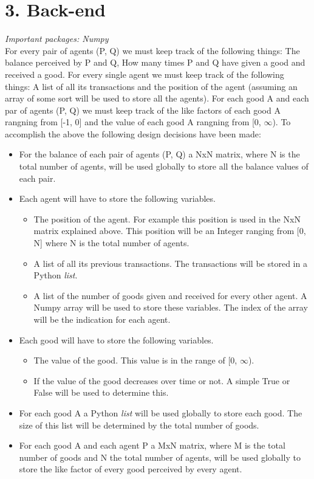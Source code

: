 \documentclass{article}
\begin{document}
\section{3. Back-end}
\textit{Important packages: Numpy}
\\
For every pair of agents (P, Q) we must keep track of the following things: The balance perceived by P and Q, How many times P and Q have given a good and received a good. For every single agent we must keep track of the following things: A list of all its transactions and the position of the agent (assuming an array of some sort will be used to store all the agents). For each good A and each par of agents (P, Q) we must keep track of the like factors  of each good A rangning from [-1, 0] and the value of each good A rangning from [0, $\infty$).
To accomplish the above the following design decisions have been made:
\begin{itemize}
  \item For the balance of each pair of agents (P, Q) a NxN matrix, where N is the total number of agents, will be used globally to store all the balance values of each pair.
  \item Each agent will have to store the following variables.
	\begin{itemize}
  		\item The position of the agent. For example this position is used in the NxN matrix explained above. This position will be an Integer ranging from [0, N] where N is the total number of agents.
  		\item A list of all its previous transactions. The transactions will be stored in a Python \textit{list}.
  		\item A list of the number of goods given and received for every other agent. A Numpy array will be used to store these variables. The index of the array will be the indication for each agent.
	\end{itemize}
  \item Each good will have to store the following variables.
	\begin{itemize}
  		\item The value of the good. This value is in the range of [0, $\infty$).
  		\item If the value of the good decreases over time or not. A simple True or False will be used to determine this.
	\end{itemize}
  \item For each good A a Python \textit{list} will be used globally to store each good. The size of this list will be determined by the total number of goods.
  \item For each good A and each agent P a MxN matrix, where M is the total number of goods and N the total number of agents, will be used globally to store the like factor of every good perceived by every agent.
\end{itemize}
\end{document}
